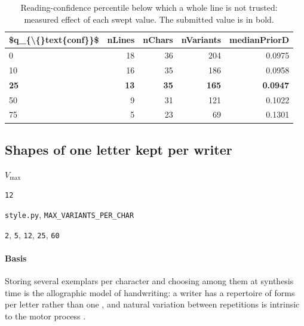 \begin{table}[htbp]
\centering
\small
\caption{Reading-confidence percentile below which a whole line is not trusted: measured effect of each swept value. The submitted value is in bold.}
\begin{tabular}{lrrrr}
\toprule
\$q\_\{\textbackslash\{\}text\{conf\}\}\$ & \textsf{nLines} & \textsf{nChars} & \textsf{nVariants} & \textsf{medianPriorD} \\
\midrule
0 & 18 & 36 & 204 & 0.0975 \\
10 & 16 & 35 & 186 & 0.0958 \\
\bfseries 25 & \bfseries 13 & \bfseries 35 & \bfseries 165 & \bfseries 0.0947 \\
50 & 9 & 31 & 121 & 0.1022 \\
75 & 5 & 23 & 69 & 0.1301 \\
\bottomrule
\end{tabular}
\end{table}

\subsection{Shapes of one letter kept per writer}

\label{coef:max-variants}

\begin{description}[leftmargin=5.2em,style=sameline]

\item[Symbol] $V_{\max}$

\item[Value] \texttt{12}

\item[Source] \texttt{style.py}, \texttt{MAX\_VARIANTS\_PER\_CHAR}

\item[Swept] \texttt{2}, \texttt{5}, \texttt{12}, \texttt{25}, \texttt{60}

\end{description}

\paragraph{Basis}

Storing several exemplars per character and choosing among them at synthesis time is the allographic model of handwriting: a writer has a repertoire of forms per letter rather than one \cite{schomaker1990}, and natural variation between repetitions is intrinsic to the motor process \cite{plamondon2000}.

